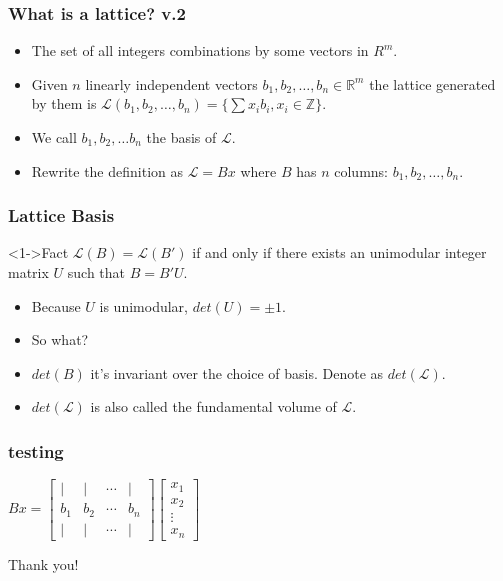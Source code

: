 \documentclass{beamer}
\begin{document}
% 
\begin{frame}
    \frametitle{What is a lattice? v.2}
    \begin{itemize}
        \item The set of all integers combinations by some vectors in $R^m$.
        \item Given $n$ linearly independent vectors $b_1, b_2, \dots, b_n \in \mathbb{R}^m$ the lattice generated by them is $\mathcal{L}(b_1, b_2, \dots, b_n) = \{ \sum\nolimits{}{x_ib_i} , x_i \in \mathbb{Z}\}$.
        \item We call $b_1, b_2, \dots b_n$ the basis of $\mathcal{L}$.
        \item Rewrite the definition as $\mathcal{L} = Bx$ where $B$ has $n$ columns: $b_1, b_2, \dots, b_n$.

    \end{itemize}
\end{frame}

\begin{frame}
    \frametitle{Lattice Basis}
    \begin{block}<1->{Fact}
        $\mathcal{L}(B) = \mathcal{L}(B')$ if and only if there exists an unimodular integer matrix $U$ such that $B = B'U$.
    \end{block} 
    \begin{itemize}
        \pause \item Because $U$ is unimodular, $det(U) = \pm 1$.
        \pause \item So what?
        \pause \item $det(B)$ it's invariant over the choice of basis. Denote as $det(\mathcal{L})$.
        \pause \item $det(\mathcal{L})$ is also called the fundamental volume of $\mathcal{L}$.
    \end{itemize}
\end{frame}
\begin{frame}
    \frametitle{testing}
    \begin{center}
    $Bx = 
      \begin{bmatrix}
            | & | & \cdots & |\\
            b_1 & b_2 & \cdots & b_n \\
            | & | & \cdots & |
     \end{bmatrix}
     \begin{bmatrix}
        x_1\\
        x_2\\
        \vdots \\
        x_n 
    \end{bmatrix}$
    \end{center}
\end{frame}


\begin{frame}
\Huge{\centerline{Thank you!}}
\end{frame}
\end{document}
